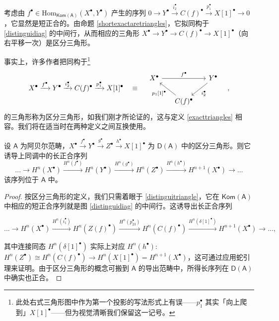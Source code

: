 \begin{Rem}\label{alternadistinguitriang}
	考虑由 $f^\bullet\in\text{Hom}_\mathsf{Kom(A)}(X^\bullet,Y^\bullet)$ 产生的序列 $0\rightarrow Y^\bullet\xrightarrow{i_2^\bullet} C(f)^\bullet\xrightarrow{p_1^\bullet} X[1]^\bullet\rightarrow 0$，它显然是短正合的。由命题 \ref{shortexactaretriangles}，它拟同构于 \eqref{distinguidiag} 的中间行，从而相应的三角形 $X^\bullet\rightarrow Y^\bullet\rightarrow C(f)^\bullet\rightarrow X[1]^\bullet$（向右平移一次）是区分三角形。 
	
	事实上，许多作者把同构于\footnote{此处右式三角形图中作为第一个投影的写法形式上有误——$p_1^\bullet$ 其实「向上爬到」$X[1]^\bullet$——但为视觉清晰我们保留这一记号。} 
	\begin{equation}\label{conetriangle}
		X^\bullet\xrightarrow{f^\bullet} Y^\bullet\xrightarrow{i_2^\bullet} C(f)^\bullet\xrightarrow{p_1^\bullet} X[1]^\bullet
		\quad\equiv\quad
		\begin{tikzcd}[column sep=0.5cm]
			X^\bullet\arrow[rr, "f^\bullet"] & & Y^\bullet\arrow[dl, "i_2^\bullet"] \\
			& C(f)^\bullet\arrow[ul, "{p_1[1]^\bullet}"]
		\end{tikzcd}\quad,
	\end{equation}
	的三角形称为区分三角形，如我们刚才所论证的，这与定义 \ref{exacttriangles} 相容。我们将在适当时在两种定义之间互换使用。
\end{Rem}

\begin{Thm}\label{longexactcohomtriangles}
	设 $\mathsf{A}$ 为阿贝尔范畴，$X^\bullet\xrightarrow{f^\bullet} Y^\bullet\xrightarrow{g^\bullet} Z^\bullet\xrightarrow{h^\bullet} X[1]^\bullet$ 为 $\mathsf{D(A)}$ 中的区分三角形。则它诱导上同调中的长正合序列
	\begin{equation}
		\!...\rightarrow H^n(X^\bullet)\xrightarrow{H^n(f^\bullet)} H^n(Y^\bullet)\xrightarrow{H^n(g^\bullet)} H^n(Z^\bullet)\xrightarrow{H^n(h^\bullet)} H^{n+1}(X^\bullet)\rightarrow...
	\end{equation}
	该序列位于 $\mathsf{A}$ 中。
\end{Thm}

\begin{proof}
	按区分三角形的定义，我们只需着眼于 \eqref{distinguitriangle}，它在 $\mathsf{Kom(A)}$ 中相应的短正合序列就是图 \eqref{distinguidiag} 的中间行。这诱导出长正合序列
	\begin{small}\[
		...\!\rightarrow H^n(X^\bullet)\xrightarrow{H^n(i_1^\bullet)} H^n(Z(f)^\bullet)\xrightarrow{H^n(p_{23}^\bullet)} H^n(C(f)^\bullet)\xrightarrow{H^n(\delta[1]^\bullet)} H^{n+1}(X^\bullet)\rightarrow\!...,
		\]\end{small}
	\!其中连接同态 $H^n(\delta[1]^\bullet)$ 实际上对应 $H^n(h^\bullet)\!:$ $H^n(Z^\bullet)\cong H^n(C(f)^\bullet)\rightarrow H^n(X[1]^\bullet)=H^{n+1}(X^\bullet)$，这可通过应用蛇引理来证明。由于区分三角形的概念可搬到 $\mathsf{A}$ 的导出范畴中，所得长序列在 $\mathsf{D(A)}$ 中确实也正合。
\end{proof}

